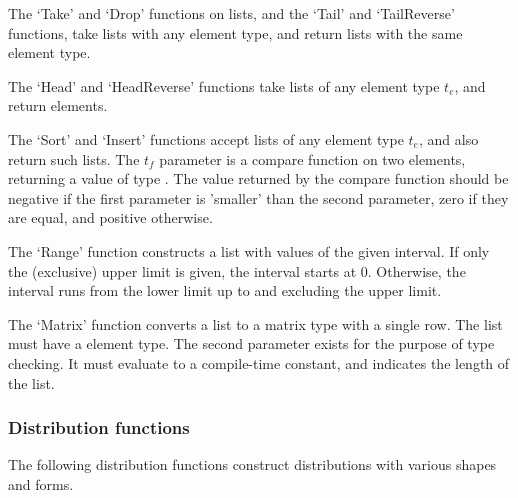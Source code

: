 {The `Take' and `Drop' functions on lists, and the `Tail' and `TailReverse'
functions, take lists with any element type, and return lists with the same
element type.

The `Head' and `HeadReverse' functions take lists of any element type $t_e$,
and return elements.

The `Sort' and `Insert' functions accept lists of any element type $t_e$, and
also return such lists. The $t_f$ parameter is a compare function on two
elements, returning a value of type . The value returned by
the compare function should be negative if the first parameter is 'smaller'
than the second parameter, zero if they are equal, and positive otherwise.

The `Range' function constructs a list with values of the given interval. If
only the (exclusive) upper limit is given, the interval starts at 0.
Otherwise, the interval runs from the lower limit up to and excluding the
upper limit.

The `Matrix' function converts a list to a matrix type with a single row. The
list must have a  element type. The second parameter
exists for the purpose of type checking. It must evaluate to a compile-time
constant, and indicates the length of the list.

\subsubsection{Distribution functions}
The following distribution functions construct distributions with various
shapes and forms.

}
